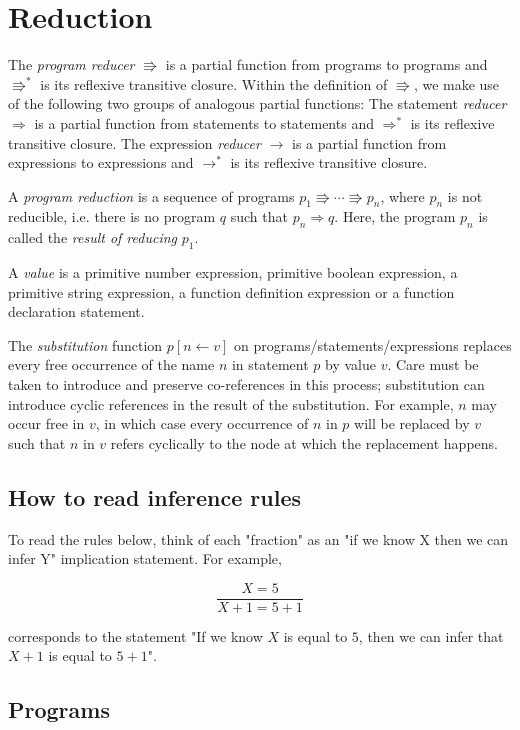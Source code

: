 \section*{Reduction}

The 
\emph{program reducer} $\Rrightarrow$ is a partial function from
programs to
programs
and $\Rrightarrow^*$ is its reflexive transitive closure.
Within the definition of $\Rrightarrow$, we make use of
the following two groups of analogous partial functions:
The statement
\emph{reducer} $\Rightarrow$ is a partial function from
statements to statements
and $\Rightarrow^*$ is its reflexive transitive closure.
The expression
\emph{reducer} $\rightarrow$ is a partial function from
expressions to expressions
and $\rightarrow^*$ is its reflexive transitive closure.

A \emph{program reduction} is a sequence of programs
$p_1 \Rrightarrow \cdots \Rrightarrow p_n$,
where $p_n$ is not reducible, i.e. there is no
program $q$ such that $p_n \Rightarrow q$.
Here, the program $p_n$ is called the \emph{result
of reducing} $p_1$.

A \emph{value} is a primitive number expression,
primitive boolean expression,
a primitive string expression, a function definition
expression or a function declaration statement.

The \emph{substitution} function 
$p [ n \leftarrow v ]$ on programs/statements/expressions
replaces every free occurrence of the name $n$
in statement $p$ by value $v$. Care must be taken to introduce
and preserve
co-references in this process; substitution can introduce
cyclic references in the result of the substitution. For example,
$n$ may occur free in $v$, in which case
every occurrence of $n$ in $p$
will be replaced by $v$ such that $n$ in $v$ refers cyclically
to the node at which the replacement happens.


\subsection*{How to read inference rules}

To read the rules below, think of each "fraction" as an
"if we know X then we can infer Y" implication statement.
For example,

\[
\frac{
  X = 5
}{
  X + 1 = 5 + 1
}
\]

corresponds to the statement
"If we know $X$ is equal to $5$,
then we can infer that $X + 1$ is equal to $5 + 1$".


\subsection*{Programs}


